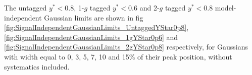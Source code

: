 


The untagged $y^{*} < 0.8$, 1-$g$ tagged $y^{*} < 0.6$ and 2-$g$ tagged $y^{*} < 0.8$ model-independent Gaussian limits are shown in fig \ref{fig:SignalIndependentGaussianLimits_UntaggedYStar0p8}, \ref{fig:SignalIndependentGaussianLimits_1gYStar0p6} and \ref{fig:SignalIndependentGaussianLimits_2gYStar0p8} respectively, for Gaussians with width equal to 0, 3, 5, 7, 10 and 15\% of their peak position, without systematics included. 

